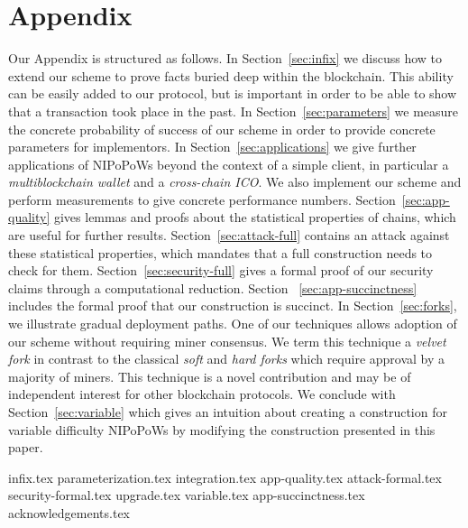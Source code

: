 \appendix
\section*{Appendix}

Our Appendix is structured as follows.
In Section~\ref{sec:infix} we discuss how to extend our scheme to prove facts
buried deep within the blockchain. This ability can be easily added to our
protocol, but is important in order to be able to show that a transaction took
place in the past.
In Section~\ref{sec:parameters} we measure the concrete probability of success
of our scheme in order to provide concrete parameters for implementors.
In Section~\ref{sec:applications} we give further applications of NIPoPoWs
beyond the context of a simple client, in particular a \emph{multiblockchain
wallet} and a \emph{cross-chain ICO}. We also implement our scheme and
perform measurements to give concrete performance numbers.
Section~\ref{sec:app-quality} gives lemmas and proofs about the statistical
properties of chains, which are useful for further results.
Section~\ref{sec:attack-full} contains
an attack against these statistical properties, which mandates that a full construction needs to check for them. Section~\ref{sec:security-full} gives a formal
proof of our security claims through a computational reduction.
Section~
\ref{sec:app-succinctness} includes the formal proof that our construction is succinct.
In Section~\ref{sec:forks}, we illustrate
gradual deployment paths. One of our techniques allows adoption of our scheme
without requiring miner consensus. We term this technique a \emph{velvet fork}
in contrast to the classical \emph{soft} and \emph{hard forks} which require
approval by a majority of miners. This technique is a novel contribution and may
be of independent interest for other blockchain protocols.
We conclude with Section~\ref{sec:variable} which gives an intuition about creating a
construction for variable difficulty NIPoPoWs by modifying the construction
presented in this paper.

{infix.tex}
{parameterization.tex}
{integration.tex}
{app-quality.tex}
{attack-formal.tex}
{security-formal.tex}
{upgrade.tex}
{variable.tex}
{app-succinctness.tex}
{acknowledgements.tex}
